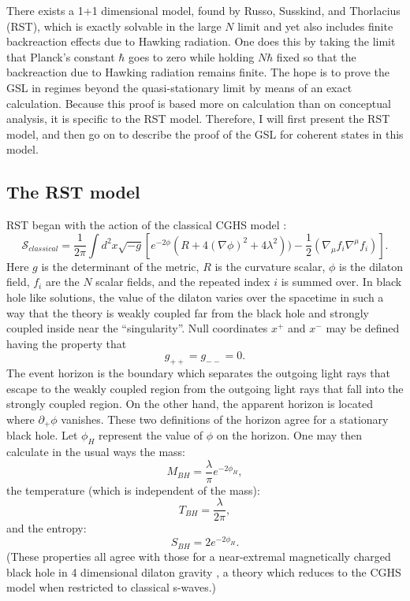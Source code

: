\documentclass{article}
\begin{document}
There exists a 1+1 dimensional model, found by Russo, Susskind, and Thorlacius (RST), which is exactly solvable in the large $N$ limit and yet also includes finite backreaction effects due to Hawking radiation.  One does this by taking the limit that Planck's constant $\hbar$ goes to zero while holding $N \hbar$ fixed so that the backreaction due to Hawking radiation remains finite.  The hope is to prove the GSL in regimes beyond the quasi-stationary limit by means of an exact calculation.  Because this proof is based more on calculation than on conceptual analysis, it is specific to the RST model.  Therefore, I will first present the RST model, and then go on to describe the proof of the GSL for coherent states in this model.

\subsection{The RST model}

RST \cite{RST92} began with the action of the classical CGHS model \cite{CGHS91}:
\begin{equation}
\mathcal{S}_{classical} = \frac{1}{2\pi}\int d^2x \sqrt{-g}
\left[ e^{-2\phi}(R + 4(\nabla \phi)^2 +4\lambda^2))
- \frac{1}{2}(\nabla_{\mu} f_i \nabla^{\mu} f_i) \right].
\end{equation}
Here $g$ is the determinant of the metric, $R$ is the curvature scalar, $\phi$ is the dilaton field, $f_i$ are the $N$ scalar fields, and the repeated index $i$ is summed over.  In black hole like solutions, the value of the dilaton varies over the spacetime in such a way that the theory is weakly coupled far from the black hole and strongly coupled inside near the ``singularity''.  Null coordinates $x^+$ and $x^-$ may be defined having the property that
\begin{equation}
g_{++} = g_{--} = 0.
\end{equation}
The event horizon is the boundary which separates the outgoing light rays that escape to the weakly coupled region from the outgoing light rays that fall into the strongly coupled region.   On the other hand, the apparent horizon is located where $\partial_{+}\phi$ vanishes.  These two definitions of the horizon agree for a stationary black hole.  Let $\phi_H$ represent the value of $\phi$ on the horizon.  One may then calculate in the usual ways the mass:
\begin{equation}\label{CGHS}
M_{BH} = \frac{\lambda}{\pi}e^{-2\phi_H},
\end{equation}
the temperature (which is independent of the mass):
\begin{equation}
T_{BH} = \frac{\lambda}{2\pi},
\end{equation}
and the entropy:
\begin{equation}\label{2dBH}
S_{BH} = 2e^{-2\phi_H}.
\end{equation}
(These properties all agree with those for a near-extremal magnetically charged black hole in 4 dimensional dilaton gravity \cite{GM88}, a theory which reduces to the CGHS model when restricted to classical s-waves.)
\end{document}
